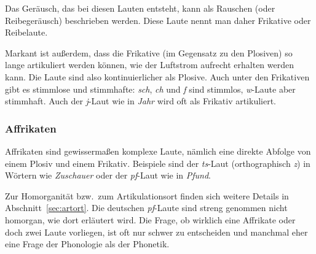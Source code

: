 
Das Geräusch, das bei diesen Lauten entsteht, kann als Rauschen (oder Reibegeräusch) beschrieben werden.
Diese Laute nennt man daher Frikative oder Reibelaute.


Markant ist außerdem, dass die Frikative (im Gegensatz zu den Plosiven) so lange artikuliert werden können, wie der Luftstrom aufrecht erhalten werden kann.
Die Laute sind also kontinuierlicher als Plosive.
Auch unter den Frikativen gibt es stimmlose und stimmhafte: \textit{sch}, \textit{ch} und \textit{f} sind stimmlos, \textit{w}-Laute aber \zB stimmhaft.
Auch der \textit{j}-Laut wie in \textit{Jahr} wird oft als Frikativ artikuliert.

\subsubsection{Affrikaten}

Affrikaten sind gewissermaßen komplexe Laute, nämlich eine direkte Abfolge von einem Plosiv und einem Frikativ.
Beispiele sind der \textit{ts}-Laut (orthographisch \textit{z}) in Wörtern wie \textit{Zuschauer} oder der \textit{pf}-Laut wie in \textit{Pfund}.


Zur Homorganität bzw.\ zum Artikulationsort finden sich weitere Details in Ab\-schnitt~\ref{sec:artort}.
Die deutschen \textit{pf}-Laute sind \zB streng genommen nicht homorgan, wie dort erläutert wird.
Die Frage, ob wirklich eine Affrikate oder doch zwei Laute vorliegen, ist oft nur schwer zu entscheiden und manchmal eher eine Frage der Phonologie als der Phonetik.

